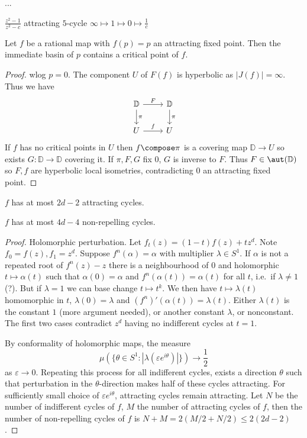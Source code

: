 \documentclass[a4paper]{article}
\newcommand{\D}{\mathbb{D}}
\begin{document}
...

\(\frac{z^2 - 1}{z^2 - c}\) attracting \(5\)-cycle \(\infty \mapsto 1 \mapsto 0 \mapsto \frac{1}{c}\)

\begin{proposition}
  Let \(f\) be a rational map with \(f(p) = p\) an attracting fixed point. Then the immediate basin of \(p\) contains a critical point of \(f\).
\end{proposition}

\begin{proof}
  wlog \(p = 0\). The component \(U\) of \(F(f)\) is hyperbolic as \(|J(f)| = \infty\). Thus we have
  \[
    \begin{tikzcd}
      \D \ar[r, "F"] \ar[d, "\pi"] & \D \ar[d, "\pi"] \\
      U \ar[r, "f"] & U
    \end{tikzcd}
  \]
  If \(f\) has no critical points in \(U\) then \(f \compose \pi\) is a covering map \(\D \to U\) so exists \(G: \D \to \D\) covering it. If \(\pi, F, G\) fix \(0\), \(G\) is inverse to \(F\). Thus \(F \in \aut(\D)\) so \(F, f\) are hyperbolic local isometries, contradicting \(0\) an attracting fixed point.
\end{proof}

\begin{corollary}
  \(f\) has at most \(2d - 2\) attracting cycles.
\end{corollary}

\begin{corollary}
  \(f\) has at most \(4d - 4\) non-repelling cycles.
\end{corollary}

\begin{proof}
  Holomorphic perturbation. Let \(f_t(z) = (1 - t) f(z) + tz^d\). Note \(f_0 = f(z), f_1 = z^d\). Suppose \(f^n(\alpha) = \alpha\) with multiplier \(\lambda \in S^1\). If \(\alpha\) is not a repeated root of \(f^n(z) - z\) there is a neighbourhood of \(0\) and holomorphic \(t \mapsto \alpha(t)\) such that \(\alpha(0) = \alpha\) and \(f^n(\alpha(t)) = \alpha(t)\) for all \(t\), i.e.\ if \(\lambda \ne 1\) (?). But if \(\lambda = 1\) we can base change \(t \mapsto t^k\). We then have \(t \mapsto \lambda(t)\) homomorphic in \(t\), \(\lambda(0) = \lambda\) and \((f^n)'(\alpha(t)) = \lambda(t)\). Either \(\lambda(t)\) is the constant \(1\) (more argument needed), or another constant \(\lambda\), or nonconstant. The first two cases contradict \(z^d\) having no indifferent cycles at \(t = 1\).

  By conformality of holomorphic maps, the measure
  \[
    \mu(\{\theta \in S^1: |\lambda(\varepsilon e^{i\theta})|\}) \to \frac{1}{2}
  \]
  as \(\varepsilon \to 0\). Repeating this process for all indifferent cycles, exists a direction \(\theta\) such that perturbation in the \(\theta\)-direction makes half of these cycles attracting. For sufficiently small choice of \(\varepsilon e^{i\theta}\), attracting cycles remain attracting. Let \(N\) be the number of indifferent cycles of \(f\), \(M\) the number of attracting cycles of \(f\), then the number of non-repelling cycles of \(f\) is \(N + M = 2(M/2 + N/2) \leq 2 (2d - 2)\).
\end{proof}
\end{document}

